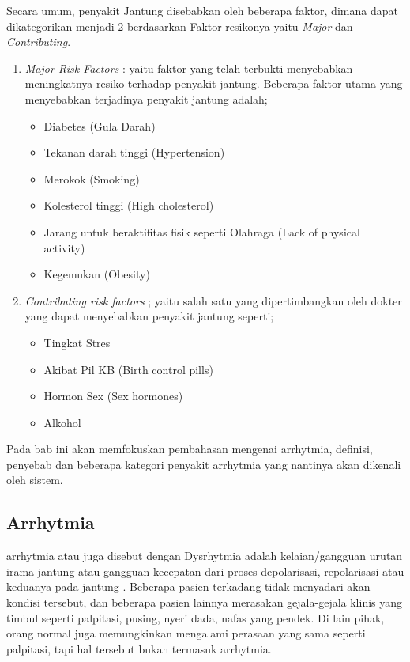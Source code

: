 Secara umum, penyakit Jantung disebabkan oleh beberapa faktor, dimana dapat 
dikategorikan menjadi 2 berdasarkan Faktor resikonya yaitu  \textit{Major} dan
\textit{Contributing}.
\begin{enumerate}
    \item \textit{Major Risk Factors} : yaitu faktor yang telah terbukti 
    menyebabkan meningkatnya resiko terhadap penyakit jantung.  Beberapa faktor
    utama yang menyebabkan terjadinya penyakit jantung adalah;
	\begin{itemize}
	    \item Diabetes (Gula Darah)
	    \item Tekanan darah tinggi (Hypertension)
	    \item Merokok (Smoking)
	    \item Kolesterol tinggi (High cholesterol)
	    \item Jarang untuk beraktifitas fisik seperti Olahraga  (Lack of physical
	    activity)
	    \item Kegemukan (Obesity)
	\end{itemize}

	\item \textit{Contributing risk factors} ; yaitu salah satu  yang
	dipertimbangkan oleh dokter yang dapat menyebabkan penyakit jantung seperti;
	\begin{itemize}
	    \item Tingkat Stres
	    \item Akibat Pil KB (Birth control pills)
	    \item Hormon Sex (Sex hormones)
	    \item Alkohol
	\end{itemize}
\end{enumerate}

Pada bab ini \saya akan memfokuskan pembahasan
mengenai arrhytmia, definisi, penyebab dan beberapa kategori penyakit arrhytmia
yang nantinya akan dikenali oleh sistem.

\subsection{Arrhytmia}
\label{ssec:arrhytmia}
\Gls{arrhytmia} atau juga disebut dengan Dysrhytmia adalah kelaian/gangguan
urutan irama jantung atau gangguan kecepatan dari proses depolarisasi, repolarisasi
atau keduanya pada jantung \cite{karim.1}. Beberapa pasien terkadang tidak
menyadari akan kondisi tersebut, dan beberapa pasien lainnya merasakan
gejala-gejala klinis yang timbul seperti \gls{palpitasi}, pusing, nyeri dada,
nafas yang pendek. Di lain pihak, orang normal juga memungkinkan mengalami perasaan
yang sama seperti \gls{palpitasi}, tapi hal tersebut bukan termasuk arrhytmia.


